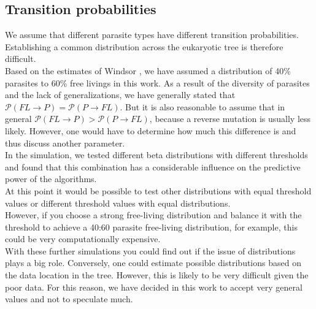     \subsection{Transition probabilities} \label{sec:discussion - transition probabilities}
      We assume that different parasite types have different transition probabilities. Establishing a 
        common distribution across the eukaryotic tree is therefore difficult. \\
      Based on the estimates of Windsor \cite{Windsor1998}, we have assumed a distribution of 40\% 
        parasites to 60\% free livings in this work. As a result of the diversity of parasites and the 
        lack of generalizations, we have generally stated that 
        $\mathcal{P}(FL \rightarrow P) = \mathcal{P}(P \rightarrow FL)$. But it is also reasonable to 
        assume that in general $\mathcal{P}(FL \rightarrow P) > \mathcal{P}(P \rightarrow FL)$, because 
        a reverse mutation is usually less likely. However, one would have to determine how much this 
        difference is and thus discuss another parameter. \\
      
      In the simulation, we tested different beta distributions with different thresholds and found that 
        this combination has a considerable influence on the predictive power of the algorithms. \\
      At this point it would be possible to test other distributions with equal threshold values or 
        different threshold values with equal distributions. \\
      However, if you choose a strong free-living distribution and balance it with the threshold to 
        achieve a 40:60 parasite free-living distribution, for example, this could be very 
        computationally expensive. \\
      
      With these further simulations you could find out if the issue of distributions plays a big role. 
        Conversely, one could estimate possible distributions based on the data location in the tree. 
        However, this is likely to be very difficult given the poor data. For this reason, we have 
        decided in this work to accept very general values and not to speculate much. \\

